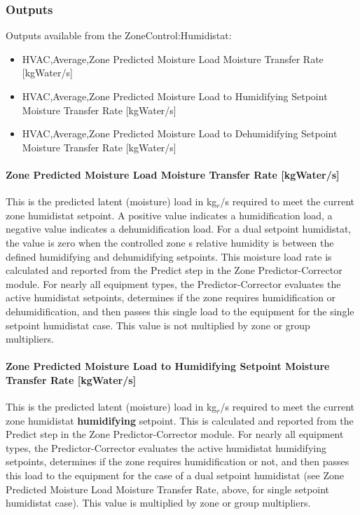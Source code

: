 \subsubsection{Outputs}\label{outputs-2-027}

Outputs available from the ZoneControl:Humidistat:

\begin{itemize}
\item
  HVAC,Average,Zone Predicted Moisture Load Moisture Transfer Rate {[}kgWater/s{]}
\item
  HVAC,Average,Zone Predicted Moisture Load to Humidifying Setpoint Moisture Transfer Rate {[}kgWater/s{]}
\item
  HVAC,Average,Zone Predicted Moisture Load to Dehumidifying Setpoint Moisture Transfer Rate {[}kgWater/s{]}
\end{itemize}

\paragraph{Zone Predicted Moisture Load Moisture Transfer Rate {[}kgWater/s{]}}\label{zone-predicted-moisture-load-moisture-transfer-rate-kgwaters}

This is the predicted latent (moisture) load in kg\(_{r}\)/s required to meet the current zone humidistat setpoint. A positive value indicates a humidification load, a negative value indicates a dehumidification load. For a dual setpoint humidistat, the value is zero when the controlled zone s relative humidity is between the defined humidifying and dehumidifying setpoints. This moisture load rate is calculated and reported from the Predict step in the Zone Predictor-Corrector module. For nearly all equipment types, the Predictor-Corrector evaluates the active humidistat setpoints, determines if the zone requires humidification or dehumidification, and then passes this single load to the equipment for the single setpoint humidistat case. This value is not multiplied by zone or group multipliers.

\paragraph{Zone Predicted Moisture Load to Humidifying Setpoint Moisture Transfer Rate {[}kgWater/s{]}}\label{zone-predicted-moisture-load-to-humidifying-setpoint-moisture-transfer-rate-kgwaters}

This is the predicted latent (moisture) load in kg\(_{r}\)/s required to meet the current zone humidistat \textbf{humidifying} setpoint. This is calculated and reported from the Predict step in the Zone Predictor-Corrector module. For nearly all equipment types, the Predictor-Corrector evaluates the active humidistat humidifying setpoints, determines if the zone requires humidification or not, and then passes this load to the equipment for the case of a dual setpoint humidistat (see Zone Predicted Moisture Load Moisture Transfer Rate, above, for single setpoint humidistat case). This value is multiplied by zone or group multipliers.

